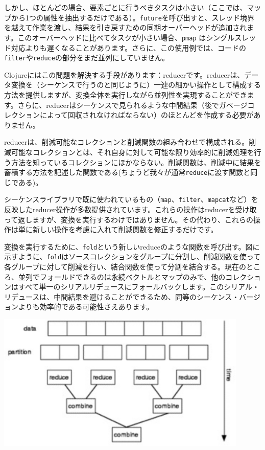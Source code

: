 しかし、ほとんどの場合、要素ごとに行うべきタスクは小さい（ここでは、マップから1つの属性を抽出するだけである）。\texttt{future}を呼び出すと、スレッド境界を越えて作業を渡し、結果を引き戻すための同期オーバーヘッドが追加されます。このオーバーヘッドに比べてタスクが小さい場合、\texttt{pmap} はシングルスレッド対応よりも遅くなることがあります。さらに、この使用例では、コードの\texttt{filter}や\texttt{reduce}の部分をまだ並列にしていません。

Clojureにはこの問題を解決する手段があります：reducerです。reducerは、データ変換を（シーケンスで行うのと同じように）一連の細かい操作として構成する方法を提供しますが、変換全体を実行しながら並列性を実現することができます。さらに、reducerはシーケンスで見られるような中間結果（後でガベージコレクションによって回収されなければならない）のほとんどを作成する必要がありません。

reducerは、削減可能なコレクションと削減関数の組み合わせで構成される。削減可能なコレクションとは、それ自身に対して可能な限り効率的に削減処理を行う方法を知っているコレクションにほかならない。削減関数は、削減中に結果を蓄積する方法を記述した関数である(ちょうど我々が通常\texttt{reduce}に渡す関数と同じである)。

シーケンスライブラリで既に使われているもの（\texttt{map}、\texttt{filter}、\texttt{mapcat}など）を反映したreducer操作が多数提供されています。これらの操作はreducerを受け取って返しますが、変換を実行するわけではありません。その代わり、これらの操作は単に新しい操作を考慮に入れて削減関数を修正するだけです。

変換を実行するために、\texttt{fold}という新しいreduceのような関数を呼び出す。図に示すように、\texttt{fold}はソースコレクションをグループに分割し、削減関数を使って各グループに対して削減を行い、結合関数を使って分割を結合する。現在のところ、並列でフォールドできるのは永続ベクトルとマップのみで、他のコレクションはすべて単一のシリアルリデュースにフォールバックします。このシリアル・リデュースは、中間結果を避けることができるため、同等のシーケンス・バージョンよりも効率的である可能性さえあります。 

\includegraphics[width=12cm]{fig_05_005.eps}

